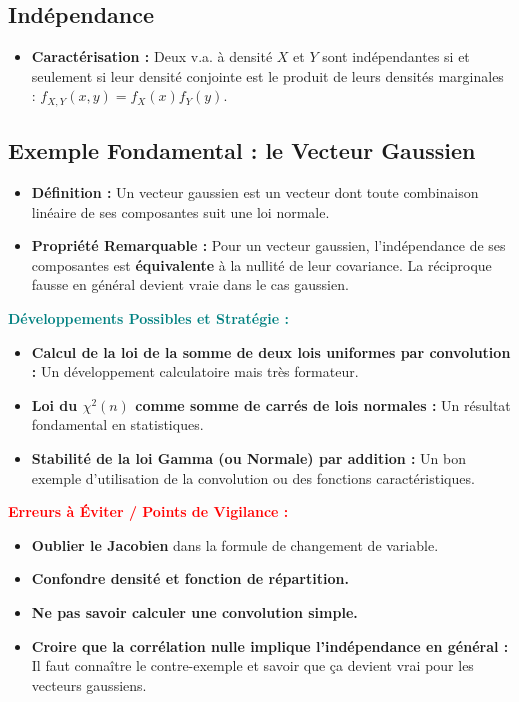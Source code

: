 \documentclass[12pt, a4paper, parskip=full]{report}
\theoremstyle{agregstyle}
\newenvironment{developpements}
  {\par\medskip\noindent\begin{oframed}\noindent\textbf{\textcolor{teal}{Développements Possibles et Stratégie :}}}
  {\end{oframed}\par\medskip}
\newenvironment{erreurs}
  {\par\medskip\noindent\begin{oframed}\noindent\textbf{\textcolor{red}{Erreurs à Éviter / Points de Vigilance :}}}
  {\end{oframed}\par\medskip}
\begin{document}
\subsection{Indépendance}
\begin{itemize}
    \item \textbf{Caractérisation :} Deux v.a. à densité $X$ et $Y$ sont indépendantes si et seulement si leur densité conjointe est le produit de leurs densités marginales : $f_{X,Y}(x,y) = f_X(x) f_Y(y)$.
\end{itemize}
\subsection{Exemple Fondamental : le Vecteur Gaussien}
\begin{itemize}
    \item \textbf{Définition :} Un vecteur gaussien est un vecteur dont toute combinaison linéaire de ses composantes suit une loi normale.
    \item \textbf{Propriété Remarquable :} Pour un vecteur gaussien, l'indépendance de ses composantes est \textbf{équivalente} à la nullité de leur covariance. La réciproque fausse en général devient vraie dans le cas gaussien.
\end{itemize}

\begin{developpements}
    \begin{itemize}
        \item \textbf{Calcul de la loi de la somme de deux lois uniformes par convolution :} Un développement calculatoire mais très formateur.
        \item \textbf{Loi du $\chi^2(n)$ comme somme de carrés de lois normales :} Un résultat fondamental en statistiques.
        \item \textbf{Stabilité de la loi Gamma (ou Normale) par addition :} Un bon exemple d'utilisation de la convolution ou des fonctions caractéristiques.
    \end{itemize}
\end{developpements}

\begin{erreurs}
    \begin{itemize}
        \item \textbf{Oublier le Jacobien} dans la formule de changement de variable.
        \item \textbf{Confondre densité et fonction de répartition.}
        \item \textbf{Ne pas savoir calculer une convolution simple.}
        \item \textbf{Croire que la corrélation nulle implique l'indépendance en général :} Il faut connaître le contre-exemple et savoir que ça devient vrai pour les vecteurs gaussiens.
    \end{itemize}
\end{erreurs}
\end{document}
